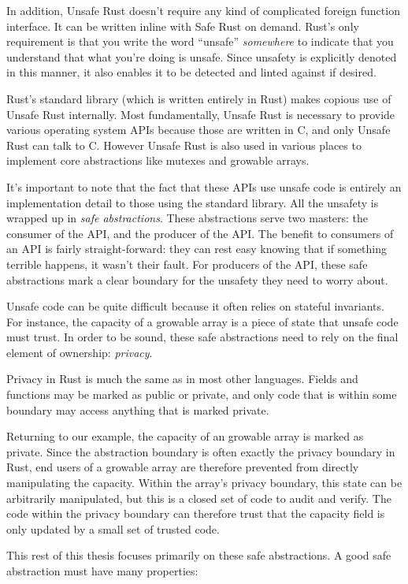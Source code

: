 In addition, Unsafe Rust doesn't require any kind of complicated foreign
function interface. It can be written inline with Safe Rust on demand. Rust's
only requirement is that you write the word ``unsafe'' \emph{somewhere} to indicate
that you understand that what you're doing is unsafe. Since unsafety is
explicitly denoted in this manner, it also enables it to be detected and linted
against if desired.

Rust's standard library (which is written entirely in Rust) makes copious use of
Unsafe Rust internally. Most fundamentally, Unsafe Rust is necessary to provide
various operating system APIs because those are written in C, and only Unsafe
Rust can talk to C. However Unsafe Rust is also used in various places to
implement core abstractions like mutexes and growable arrays.

It's important to note that the fact that these APIs use unsafe code is entirely
an implementation detail to those using the standard library. All the unsafety
is wrapped up in \emph{safe abstractions}. These abstractions serve two masters: the
consumer of the API, and the producer of the API. The benefit to consumers of an
API is fairly straight-forward: they can rest easy knowing that if something
terrible happens, it wasn't their fault. For producers of the API, these safe
abstractions mark a clear boundary for the unsafety they need to worry about.

Unsafe code can be quite difficult because it often relies on stateful
invariants. For instance, the capacity of a growable array is a piece of state
that unsafe code must trust. In order to be sound, these safe abstractions need
to rely on the final element of ownership: \emph{privacy}.

Privacy in Rust is much the same as in most other languages. Fields and functions may be marked
as public or private, and only code that is within some boundary may access anything that is
marked private.

Returning to our example, the capacity of an growable array is marked as private.
Since the abstraction boundary is often exactly the privacy boundary in Rust,
end users of a growable array are therefore prevented from directly manipulating
the capacity. Within the array's privacy boundary, this state can be arbitrarily
manipulated, but this is a closed set of code to audit and verify. The code within
the privacy boundary can therefore trust that the capacity field is only updated
by a small set of trusted code.

This rest of this thesis focuses primarily on these safe abstractions. A good safe abstraction
must have many properties:

